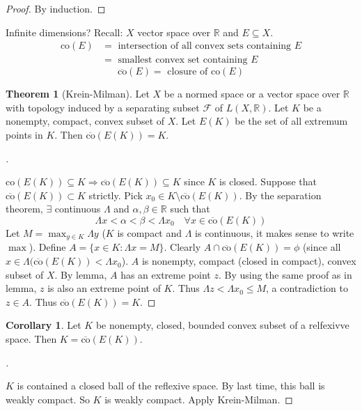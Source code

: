 \documentclass{article}
\theoremstyle{definition}
\newtheorem{thm}{Theorem}
\newtheorem{cor}{Corollary}
\newenvironment{proofs}[1][\proofname]{%
  \begin{proof}[#1]$ $\par\nobreak\ignorespaces
}{%
  \end{proof}
}
\newcommand{\F}{\mathcal F}
\newcommand{\RR}{\mathbb R}
\newcommand{\Ra}{\Rightarrow}
\begin{document}
\begin{proof}
	By induction.
\end{proof}

Infinite dimensions?
Recall: $X$ vector space over $\RR$ and $E \subseteq X$.
\[
	\begin{split}
		\text{co}(E) &= \text{ intersection of all convex sets containing }E\\
		&= \text{ smallest convex set containing } E
	\end{split}
\]
\[
	\overline{\text{co}}(E) = \text{ closure of } \text{co}(E)
\]

\begin{thm}[Krein-Milman]
	Let $X$ be a normed space or a vector space over $\RR$ with topology induced by a separating subset $\F$ of $L(X, \RR)$.
	Let $K$ be a nonempty, compact, convex subset of $X$.
	Let $E(K)$ be the set of all extremum points in $K$.
	Then $\overline{\text{co}}(E(K)) = K$.
\end{thm}

\begin{proofs}
	$\text{co}(E(K)) \subseteq K \Ra \overline{\text{co}}(E(K)) \subseteq K$ since $K$ is closed.
	Suppose that $\overline{\text{co}}(E(K)) \subset K$ strictly.
	Pick $x_0 \in K \setminus \overline{\text{co}}(E(K))$.
	By the separation theorem, $\exists$ continuous $\Lambda$ and $\alpha, \beta \in \RR$ such that
	\[
		\Lambda x < \alpha < \beta < \Lambda x_0 \quad \forall x \in \overline{\text{co}}(E(K))
	\]
	Let $M = \max_{y \in K} \Lambda y$ ($K$ is compact and $\Lambda$ is continuous, it makes sense to write $\max$).
	Define $A = \{x \in K: \Lambda x = M\}$.
	Clearly $A \cap \overline{\text{co}}(E(K)) = \phi$ (since all $x \in \Lambda(\overline{\text{co}}(E(K)) < \Lambda x_0$).
	$A$ is nonempty, compact (closed in compact), convex subset of $X$.
	By lemma, $A$ has an extreme point $z$.
	By using the same proof as in lemma, $z$ is also an extreme point of $K$.
	Thus $\Lambda z < \Lambda x_0 \leq M$, a contradiction to $z \in A$.
	Thus $\overline{\text{co}}(E(K)) = K$.
\end{proofs}

\begin{cor}
	Let $K$ be nonempty, closed, bounded convex subset of a relfexivve space.
	Then $K = \overline{\text{co}}(E(K))$.
\end{cor}

\begin{proofs}
	$K$ is contained a closed ball of the reflexive space.
	By last time, this ball is weakly compact.
	So $K$ is weakly compact.
	Apply Krein-Milman.
\end{proofs}
\end{document}

